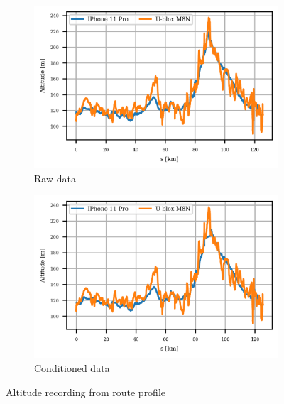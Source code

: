 \documentclass{article}
\begin{document}
			\begin{figure}[h]
		   		\centering
		     	\begin{subfigure}[b]{0.45\textwidth}
		      		\centering
		      	  	\includegraphics[width=\textwidth]{Route/raw_alt.png}
		      	  	\caption{Raw data}
		     	\end{subfigure}
		     	\begin{subfigure}[b]{0.45\textwidth}
		      	   \centering
		      	   \includegraphics[width=\textwidth]{Route/cond_alt.png}
		      	   \caption{Conditioned data}
		     	\end{subfigure}
			   \caption{Altitude recording from route profile}
			   \label{fig:route_alt}
		   \end{figure}
\end{document}
